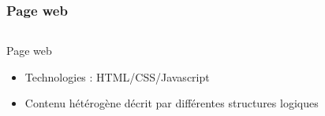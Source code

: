 \documentclass[9pt]{beamer}
\begin{document}
\begin{frame}
	\frametitle{Page web}
	\begin{columns}
	\begin{column}{5cm}
		\begin{block}{Page web}
		\begin{itemize}
			\item Technologies : HTML/CSS/Javascript
			\item Contenu hétérogène décrit par différentes structures logiques
		\end{itemize}
		\end{block}
	\end{column}
	\begin{column}{5cm}
	\end{column}
	\end{columns}
\end{frame}
\end{document}
